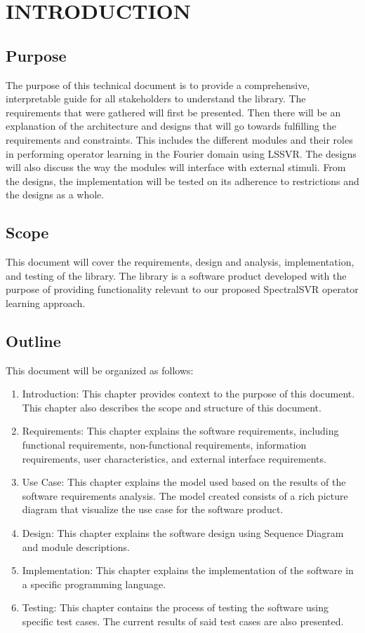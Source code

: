\chapter{INTRODUCTION}

\section{Purpose}

The purpose of this technical document is to provide a comprehensive, interpretable guide for all stakeholders to understand the library. The requirements that were gathered will first be presented. Then there will be an explanation of the architecture and designs that will go towards fulfilling the requirements and constraints. This includes the different modules and their roles in performing operator learning in the Fourier domain using LSSVR\@. The designs will also discuss the way the modules will interface with external stimuli. From the designs, the implementation will be tested on its adherence to restrictions and the designs as a whole.

\section{Scope}
This document will cover the requirements, design and analysis, implementation, and testing of the library. The library is a software product developed with the purpose of providing functionality relevant to our proposed SpectralSVR operator learning approach.

\section{Outline}
This document will be organized as follows:
\begin{enumerate}
    \item Introduction: This chapter provides context to the purpose of this document. This chapter also describes the scope and structure of this document.
    \item Requirements: This chapter explains the software requirements, including functional requirements, non-functional requirements, information requirements, user characteristics, and external interface requirements.
    \item Use Case: This chapter explains the model used based on the results of the software requirements analysis. The model created consists of a rich picture diagram that visualize the use case for the software product.
    \item Design: This chapter explains the software design using Sequence Diagram and module descriptions.
    \item Implementation: This chapter explains the implementation of the software in a specific programming language.
    \item Testing: This chapter contains the process of testing the software using specific test cases. The current results of said test cases are also presented.
\end{enumerate}
